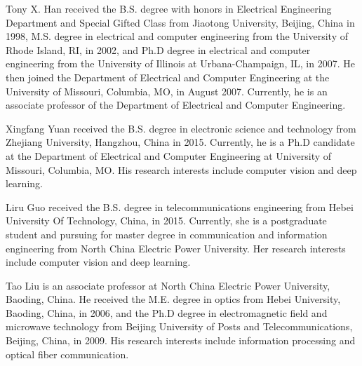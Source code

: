 \documentclass[journal]{IEEEtran}
\begin{document}
\begin{IEEEbiography}{Tony X. Han}
received the B.S. degree with honors in Electrical Engineering Department and Special Gifted Class from Jiaotong University, Beijing, China in 1998, M.S. degree in electrical and computer engineering from the University of Rhode Island, RI, in 2002, and Ph.D degree in electrical and computer engineering from the University of Illinois at Urbana-Champaign, IL, in 2007. He then joined the Department of Electrical and Computer Engineering at the University of Missouri, Columbia, MO, in August 2007. Currently, he is an associate professor of the Department of Electrical and Computer Engineering.
\end{IEEEbiography}

\begin{IEEEbiography}{Xingfang Yuan}
received the B.S. degree in electronic science and technology from Zhejiang University, Hangzhou, China in 2015. Currently, he is a Ph.D candidate at the Department of Electrical and Computer Engineering at University of Missouri, Columbia, MO. His research interests include computer vision and deep learning.
\end{IEEEbiography}

\begin{IEEEbiography}{Liru Guo}
received the B.S. degree in telecommunications engineering from Hebei University Of Technology, China, in 2015. Currently, she is a postgraduate student and pursuing for master degree in communication and information engineering from North China Electric Power University. Her research interests include computer vision and deep learning.
\end{IEEEbiography}

\begin{IEEEbiography}{Tao Liu}
is an associate professor at North China Electric Power University, Baoding, China. He received the M.E. degree in optics from Hebei University, Baoding, China, in 2006, and the Ph.D degree in electromagnetic field and microwave technology from Beijing University of Posts and Telecommunications, Beijing, China, in 2009. His research interests include information processing and optical fiber communication.
\end{IEEEbiography}
\end{document}
